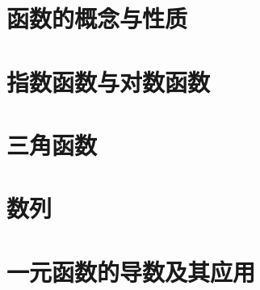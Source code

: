 \documentclass[../main.tex]{subfiles}
\begin{document}
\section{函数的概念与性质}

\section{指数函数与对数函数}

\section{三角函数}

\section{数列}

\section{一元函数的导数及其应用}
\end{document}
